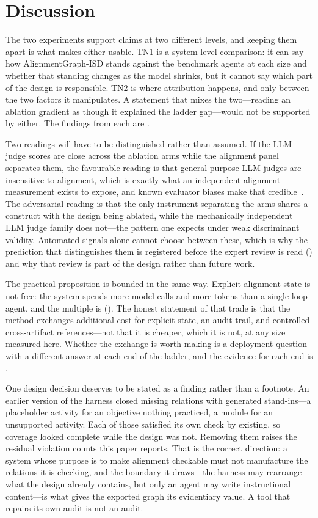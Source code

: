 \section{Discussion}
\label{sec:discussion}

The two experiments support claims at two different levels, and keeping them apart
is what makes either usable. TN1 is a system-level comparison: it can say how
AlignmentGraph-ISD stands against the benchmark agents at each size and whether that
standing changes as the model shrinks, but it cannot say which part of the design is
responsible. TN2 is where attribution happens, and only between the two factors it
manipulates. A statement that mixes the two---reading an ablation gradient as though
it explained the ladder gap---would not be supported by either. The findings from
each are \TBD.

Two readings will have to be distinguished rather than assumed. If the LLM judge
scores are close across the ablation arms while the alignment panel separates them,
the favourable reading is that general-purpose LLM judges are insensitive to alignment,
which is exactly what an independent alignment measurement exists to expose, and
known evaluator biases make that credible~\cite{panickssery2024llm}. The adversarial
reading is that the only instrument separating the arms shares a construct with the
design being ablated, while the mechanically independent LLM judge family does not---the
pattern one expects under weak discriminant validity. Automated signals alone cannot
choose between these, which is why the prediction that distinguishes them is
registered before the expert review is read () and why that review
is part of the design rather than future work.

The practical proposition is bounded in the same way. Explicit alignment state is
not free: the system spends more model calls and more tokens than a single-loop
agent, and the multiple is \TBD{} (). The honest statement of that
trade is that the method exchanges additional cost for explicit state, an audit
trail, and controlled cross-artifact references---not that it is cheaper, which it
is not, at any size measured here. Whether the exchange is worth making is a
deployment question with a different answer at each end of the ladder, and the
evidence for each end is \TBD.

One design decision deserves to be stated as a finding rather than a footnote. An
earlier version of the harness closed missing relations with generated stand-ins---a
placeholder activity for an objective nothing practiced, a module for an
unsupported activity. Each of those satisfied its own check by existing, so coverage
looked complete while the design was not. Removing them raises the residual
violation counts this paper reports. That is the correct direction: a system whose
purpose is to make alignment checkable must not manufacture the relations it is
checking, and the boundary it draws---the harness may rearrange what the design
already contains, but only an agent may write instructional content---is what gives
the exported graph its evidentiary value. A tool that repairs its own audit is not
an audit.

